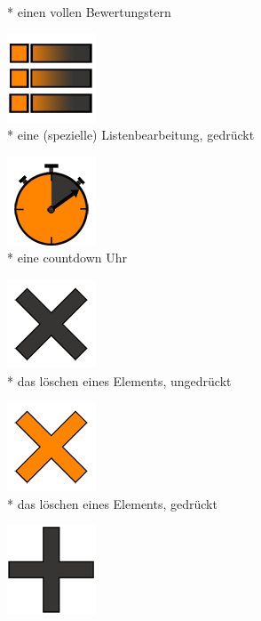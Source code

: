 \documentclass[FIPLY_base.tex]{subfiles}
\begin{document}
\begin{figure}[H]
\begin{subfigure}[b]{0.2\textwidth}
			\caption{* einen vollen Bewertungstern}
		\end{subfigure}
		\hfil
		\begin{subfigure}[b]{0.2\textwidth}
			\includegraphics[scale=0.4]{img/icons/listviewpressed}
			\caption{* eine (spezielle) Listenbearbeitung, gedrückt}
		\end{subfigure}
		\hfil
		\begin{subfigure}[b]{0.2\textwidth}
			\includegraphics[scale=0.4]{img/icons/countdown}
			\caption{* eine countdown Uhr}
		\end{subfigure}
		\hfil
		\begin{subfigure}[b]{0.2\textwidth}
			\includegraphics[scale=0.4]{img/icons/minusgreysmall}
			\caption{* das löschen eines Elements, ungedrückt}
		\end{subfigure}
		\hfil
		\begin{subfigure}[b]{0.2\textwidth}
			\includegraphics[scale=0.4]{img/icons/minusorangesmall}
			\caption{* das löschen eines Elements, gedrückt}
		\end{subfigure}
		\hfil
		\begin{subfigure}[b]{0.2\textwidth}
			\includegraphics[scale=0.4]{img/icons/plusgreysmall}

\end{subfigure}
\end{figure}
\end{document}
